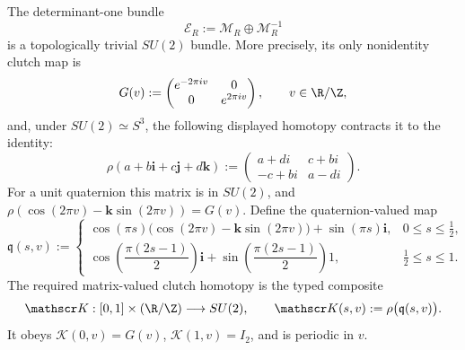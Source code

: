 \begin{proposition}
The determinant-one bundle
\begin{equation}\label{eq:s6cusp-reducible-su2-bundle}
 \mathcal E_R:=\mathcal M_R\oplus\mathcal M_R^{-1}
\end{equation}
is a topologically trivial \(SU(2)\) bundle.  More precisely, its only
nonidentity clutch map is
\begin{equation}\label{eq:s6cusp-su2-clutch-loop}
 G(v):=
 \begin{pmatrix}e^{-2\pi i v}&0\\0&e^{2\pi i v}\end{pmatrix},
 \qquad v\in\R/\Z,
\end{equation}
and, under \(SU(2)\simeq S^3\), the following displayed homotopy contracts
it to the identity:
\begin{equation}\label{eq:s6cusp-quaternion-su2-map}
 \rho(a+b\mathbf i+c\mathbf j+d\mathbf k)
 :=
 \begin{pmatrix}
  a+di&c+bi\\
  -c+bi&a-di
 \end{pmatrix}.
\end{equation}
For a unit quaternion this matrix is in \(SU(2)\), and
\(\rho(\cos(2\pi v)-\mathbf k\sin(2\pi v))=G(v)\).  Define the
quaternion-valued map
\begin{equation}\label{eq:s6cusp-su2-explicit-null-homotopy-quaternion}
 \mathfrak q(s,v):=
 \begin{cases}
  \cos(\pi s)
  \bigl(\cos(2\pi v)-\mathbf k\sin(2\pi v)\bigr)
  +\sin(\pi s)\mathbf i,
  &0\le s\le\frac12,\\[1mm]
  \cos\!\left(\dfrac{\pi(2s-1)}2\right)\mathbf i
  +\sin\!\left(\dfrac{\pi(2s-1)}2\right)1,
  &\frac12\le s\le1.
 \end{cases}
\end{equation}
The required matrix-valued clutch homotopy is the typed composite
\begin{equation}\label{eq:s6cusp-su2-explicit-null-homotopy}
 \mathscr K:[0,1]\times(\R/\Z)\longrightarrow SU(2),
 \qquad
 \mathscr K(s,v):=\rho\bigl(\mathfrak q(s,v)\bigr).
\end{equation}
It obeys \(\mathscr K(0,v)=G(v)\),
\(\mathscr K(1,v)=I_2\), and is periodic in \(v\).
\end{proposition}

